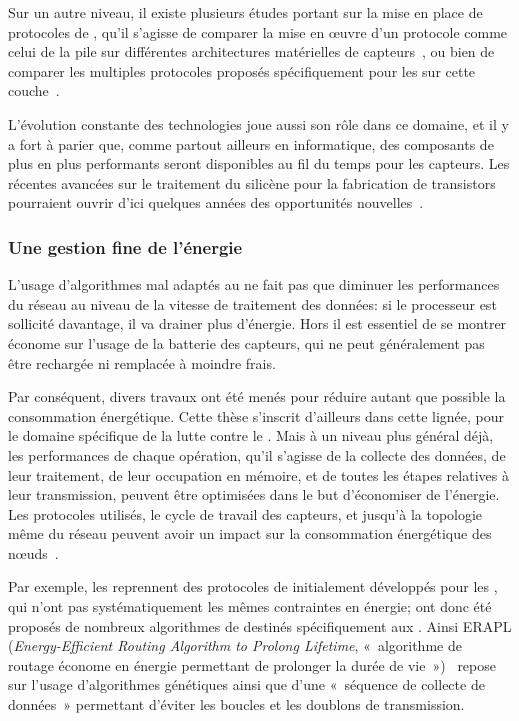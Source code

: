 Sur un autre niveau, il existe plusieurs études portant sur la mise en place de protocoles de , qu'il s'agisse de comparer la mise en œuvre d'un protocole comme celui de la pile \ieeeff sur différentes architectures matérielles de capteurs~\cite{BPCCGF07}, ou bien de comparer les multiples protocoles proposés spécifiquement pour les \rcs sur cette couche~\cite{YB09}.

L'évolution constante des technologies joue aussi son rôle dans ce domaine, et il y a fort à parier que, comme partout ailleurs en informatique, des composants de plus en plus performants seront disponibles au fil du temps pour les capteurs.
Les récentes avancées sur le traitement du silicène pour la fabrication de transistors pourraient ouvrir d'ici quelques années des opportunités nouvelles~\cite{TCCGFDMA15}.

        \subsubsection{Une gestion fine de l'énergie}
L'usage d'algorithmes mal adaptés au \rcs ne fait pas que diminuer les performances du réseau au niveau de la vitesse de traitement des données: si le processeur est sollicité davantage, il va drainer plus d'énergie.
Hors il est essentiel de se montrer économe sur l'usage de la batterie des capteurs, qui ne peut généralement pas être rechargée ni remplacée à moindre frais.

Par conséquent, divers travaux ont été menés pour réduire autant que possible la consommation énergétique.
Cette thèse s'inscrit d'ailleurs dans cette lignée, pour le domaine spécifique de la lutte contre le \dds.
Mais à un niveau plus général déjà, les performances de chaque opération, qu'il s'agisse de la collecte des données, de leur traitement, de leur occupation en mémoire, et de toutes les étapes relatives à leur transmission, peuvent être optimisées dans le but d'économiser de l'énergie.
Les protocoles utilisés, le cycle de travail des capteurs, et jusqu'à la topologie même du réseau peuvent avoir un impact sur la consommation énergétique des nœuds~\cite{ACFP09}.

Par exemple, les \rcs reprennent des protocoles de  initialement développés pour les \wanet, qui n'ont pas systématiquement les mêmes contraintes en énergie; ont donc été proposés de nombreux algorithmes de  destinés spécifiquement aux \rcs.
Ainsi ERAPL (\textit{Energy-Efficient Routing Algorithm to Prolong Lifetime}, « algorithme de routage économe en énergie permettant de prolonger la durée de vie »)~\cite{ZWPT10} repose sur l'usage d'algorithmes génétiques ainsi que d'une « séquence de collecte de données » permettant d'éviter les boucles et les doublons de transmission.

